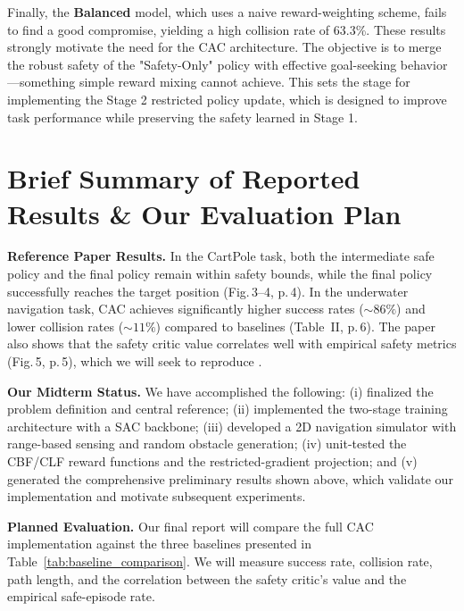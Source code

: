 \documentclass[10pt,conference]{IEEEtran}
\begin{document}
Finally, the \textbf{Balanced} model, which uses a naive reward-weighting scheme, fails to find a good compromise, yielding a high collision rate of 63.3\%. These results strongly motivate the need for the CAC architecture. The objective is to merge the robust safety of the "Safety-Only" policy with effective goal-seeking behavior—something simple reward mixing cannot achieve. This sets the stage for implementing the Stage 2 restricted policy update, which is designed to improve task performance while preserving the safety learned in Stage 1.

\section{Brief Summary of Reported Results \& Our Evaluation Plan}
\textbf{Reference Paper Results.} In the CartPole task, both the intermediate safe policy and the final policy remain within safety bounds, while the final policy successfully reaches the target position (Fig.\,3–4, p.\,4). In the underwater navigation task, CAC achieves significantly higher success rates ($\sim\!86\%$) and lower collision rates ($\sim\!11\%$) compared to baselines (Table~II, p.\,6). The paper also shows that the safety critic value correlates well with empirical safety metrics (Fig.\,5, p.\,5), which we will seek to reproduce \cite{Xie2025CAC}.

\textbf{Our Midterm Status.} We have accomplished the following: (i) finalized the problem definition and central reference; (ii) implemented the two-stage training architecture with a SAC backbone; (iii) developed a 2D navigation simulator with range-based sensing and random obstacle generation; (iv) unit-tested the CBF/CLF reward functions and the restricted-gradient projection; and (v) generated the comprehensive preliminary results shown above, which validate our implementation and motivate subsequent experiments.

\textbf{Planned Evaluation.} Our final report will compare the full CAC implementation against the three baselines presented in Table~\ref{tab:baseline_comparison}. We will measure success rate, collision rate, path length, and the correlation between the safety critic's value and the empirical safe-episode rate.
\end{document}
